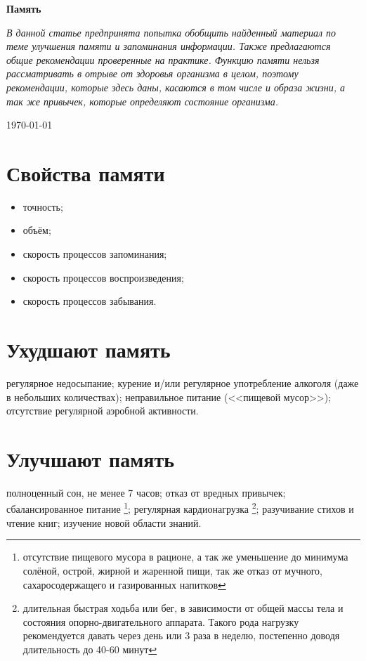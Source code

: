 \documentclass[12pt]{article}			%
\begin{document}
\begin{center}
	\Huge{\textbf{Память}}
\end{center}

\hfill

\noindent
\textit{В данной статье предпринята попытка обобщить найденный материал по теме улучшения памяти и запоминания информации. Также предлагаются общие рекомендации проверенные на практике. Функцию памяти нельзя рассматривать в отрыве от здоровья организма в целом, поэтому рекомендации, которые здесь даны, касаются в том числе и образа жизни, а так же привычек, которые определяют состояние организма.}

\begin{flushright}
	\today
\end{flushright}
\hfill

\section{Свойства памяти}
\begin{itemize}
	\item точность;
	\item объём;
	\item скорость процессов запоминания;
	\item скорость процессов воспроизведения;
	\item скорость процессов забывания.
\end{itemize}
	
\section{Ухудшают память}
\begin{outline}[itemize]
	\1 регулярное недосыпание;
	\1 курение и/или регулярное употребление алкоголя (даже в небольших количествах);
	\1 неправильное питание (<<пищевой мусор>>);
	\1 отсутствие регулярной аэробной активности.
\end{outline}

\section{Улучшают память}
\begin{outline}[itemize]
	\1 полноценный сон, не менее 7 часов;
	\1 отказ от вредных привычек;
	\1 сбалансированное питание \footnote{отсутствие пищевого мусора в рационе, а так же уменьшение до минимума солёной, острой, жирной и жаренной пищи, так же отказ от мучного, сахаросодержащего и газированных напитков};
	\1 регулярная кардионагрузка \footnote{длительная быстрая ходьба или бег, в зависимости от общей массы тела и состояния опорно-двигательного аппарата. Такого рода нагрузку рекомендуется давать через день или 3 раза в неделю, постепенно доводя длительность до 40-60 минут};
	\1 разучивание стихов и чтение книг;
	\1 изучение новой области знаний.
\end{outline}
	
\end{document}
